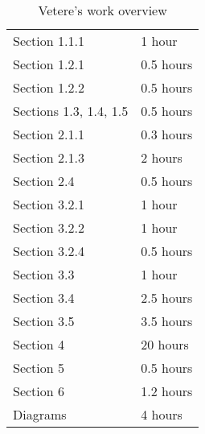 \begin{table} [H]
\centering
{}
{\centering
\begin{tabular}{m{2.5in}|m{.9in}}
Section 1.1.1 & 1 hour\\
Section 1.2.1 & 0.5 hours\\
Section 1.2.2 & 0.5 hours\\
Sections 1.3, 1.4, 1.5 & 0.5 hours\\
Section 2.1.1 & 0.3 hours\\
Section 2.1.3 & 2 hours\\
Section 2.4 & 0.5 hours\\
Section 3.2.1 & 1 hour\\
Section 3.2.2 & 1 hour\\
Section 3.2.4 & 0.5 hours\\
Section 3.3 & 1 hour\\
Section 3.4 & 2.5 hours\\
Section 3.5 & 3.5 hours\\
Section 4 & 20 hours\\
Section 5 & 0.5 hours\\
Section 6 & 1.2 hours\\
Diagrams & 4 hours
\end{tabular}
}
\caption{Vetere's work overview}
\end{table}

